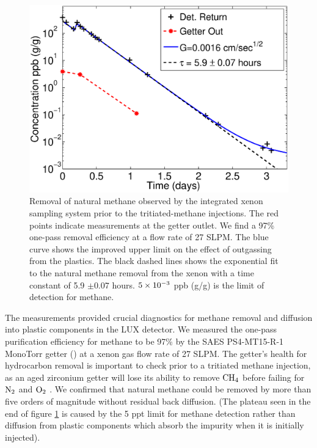 \renewcommand{\baselinestretch}{1}
\small\normalsize
\begin{figure}[h!]\centering
\includegraphics[width=120mm]{Chapter_T/Figures/July_CH4_wOG.eps}
\caption{Removal of natural methane observed by the integrated xenon sampling system prior to the tritiated-methane injections. The red points indicate measurements at the getter outlet. We find a 97\% one-pass removal efficiency at a flow rate of 27 SLPM. The blue curve shows the improved upper limit on the effect of outgassing from the plastics. The black dashed lines shows the exponential fit to the natural methane removal from the xenon with a time constant of 5.9 $\pm 0.07$ hours. $\rm 5\times10^{-3}$ ppb (g/g) is the limit of detection for methane.}
\label{fig:Removal_Methane}
\end{figure}
\renewcommand{\baselinestretch}{2}
\small\normalsize

The measurements provided crucial diagnostics for methane removal and diffusion into plastic components in the LUX detector. We measured the one-pass purification efficiency for methane to be 97\% by the SAES PS4-MT15-R-1 MonoTorr getter (\cite{SAES}) at a xenon gas flow rate of 27 SLPM. The getter's health for hydrocarbon removal is important to check prior to a tritiated methane injection, as an aged zirconium getter will lose its ability to remove $\rm CH_4$ before failing for $\rm N_2$ and $\rm O_2$ \cite{Dobi_CH4}. We confirmed that natural methane could be removed by more than five orders of magnitude without residual back diffusion. (The plateau seen in the end of figure \ref{fig:Removal_Methane} is caused by the 5 ppt limit for methane detection rather than diffusion from plastic components which absorb the impurity when it is initially injected). %

